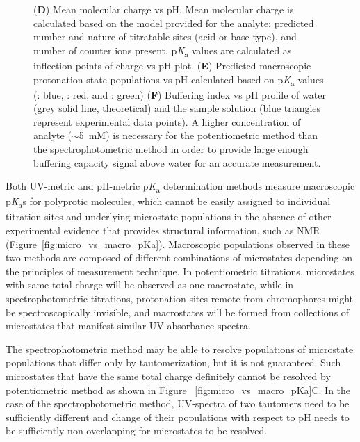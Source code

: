 \documentclass[9pt,lineno]{elife}
\newcommand{\pKa}{p\textit{K}\textsubscript{a}}
\begin{document}
\begin{figure}
{(\textbf{D}) Mean molecular charge vs pH. 
Mean molecular charge is calculated based on the model provided for the analyte: predicted number and nature of titratable sites (acid or base type), and number of counter ions present. 
\pKa{} values are calculated as inflection points of charge vs pH plot. 
(\textbf{E}) Predicted macroscopic protonation state populations vs pH calculated based on \pKa{} values (: blue, : red, and : green) 
(\textbf{F}) Buffering index vs pH profile of water (grey solid line, theoretical) and the sample solution (blue triangles represent experimental data points). 
A higher concentration of analyte ($\sim$5~mM) is necessary for the potentiometric method than the spectrophotometric method in order to provide large enough buffering capacity signal above water for an accurate measurement. 
}
\label{fig:UVmetric_vs_pHmetric_pKa}
\end{figure}

Both UV-metric and pH-metric \pKa{} determination methods measure macroscopic \pKa{}s for polyprotic molecules, which cannot be easily assigned to individual titration sites and underlying microstate populations in the absence of other experimental evidence that provides structural information, such as NMR (Figure~\ref{fig:micro_vs_macro_pKa}). 
Macroscopic populations observed in these two methods are composed of different combinations of microstates depending on the principles of measurement technique. 
In potentiometric titrations, microstates with same total charge will be observed as one macrostate, while in spectrophotometric titrations, protonation sites remote from chromophores might be spectroscopically invisible, and macrostates will be formed from collections of microstates that manifest similar UV-absorbance spectra.

The spectrophotometric method may be able to resolve populations of microstate populations that differ only by tautomerization, but it is not guaranteed. Such microstates that have the same total charge definitely cannot be resolved by potentiometric method as shown in Figure ~\ref{fig:micro_vs_macro_pKa}C. In the case of the spectrophotometric method, UV-spectra of two tautomers need to be sufficiently different and change of their populations with respect to pH needs to be sufficiently non-overlapping for microstates to be resolved. 
\end{document}
